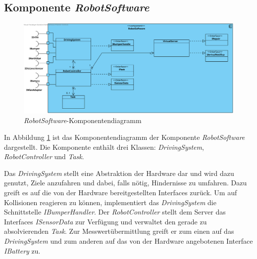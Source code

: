 \subsection{Komponente \textit{RobotSoftware}}
\begin{figure}[H]
\centering
\includegraphics[width=1\textwidth]{img/2-Entwurf-5-RobotSoftware}
\caption{\emph{RobotSoftware}-Komponentendiagramm}
\label{KomponentenStruktur2}
\end{figure}
In Abbildung \ref{KomponentenStruktur2} ist das Komponentendiagramm der Komponente \textit{RobotSoftware} dargestellt. 
Die Komponente enthält drei Klassen: \textit{DrivingSystem}, \textit{RobotController} und \textit{Task}.


Das \textit{DrivingSystem} stellt eine Abstraktion der Hardware dar und wird dazu genutzt, Ziele anzufahren und dabei,
falls nötig, Hindernisse zu umfahren. 
Dazu greift es auf die von der Hardware bereitgestellten Interfaces zurück.
Um auf Kollisionen reagieren zu können, implementiert das \textit{DrivingSystem} die Schnittstelle \textit{IBumperHandler}.
Der \textit{RobotController} stellt dem Server das Interfaces \textit{ISensorData} zur Verfügung und verwaltet den gerade
zu absolvierenden \emph{Task}. 
Zur Messwertübermittlung greift er zum einen auf das \textit{DrivingSystem} und zum anderen auf das
von der Hardware angebotenen Interface \textit{IBattery} zu.
